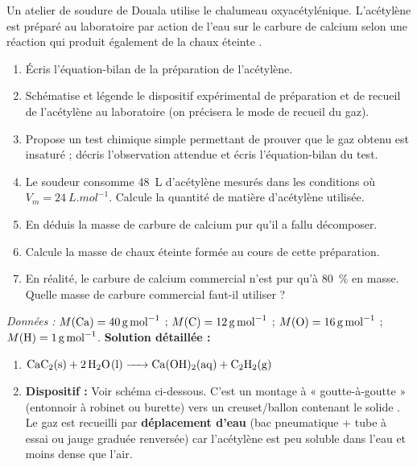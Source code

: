 \documentclass[11pt]{article}
\begin{document}
\begin{exoresolu}
Un atelier de soudure de Douala utilise le chalumeau oxyacétylénique. L'acétylène  est préparé au laboratoire par action de l'eau sur le carbure de calcium  selon une réaction qui produit également de la chaux éteinte .
\begin{enumerate}
\item Écris l'équation-bilan de la préparation de l'acétylène.
\item Schématise et légende le dispositif expérimental de préparation et de recueil de l'acétylène au laboratoire (on précisera le mode de recueil du gaz).
\item Propose un test chimique simple permettant de prouver que le gaz obtenu est insaturé ; décris l'observation attendue et écris l'équation-bilan du test.
\item Le soudeur consomme \SI{48}{L} d'acétylène mesurés dans les conditions où $V_m = \SI{24}{L.mol^{-1}}$. Calcule la quantité de matière d'acétylène utilisée.
\item En déduis la masse de carbure de calcium pur qu'il a fallu décomposer.
\item Calcule la masse de chaux éteinte  formée au cours de cette préparation.
\item En réalité, le carbure de calcium commercial n'est pur qu'à \SI{80}{\%} en masse. Quelle masse de carbure commercial faut-il utiliser ?
\end{enumerate}
\emph{Données :} $M(\ce{Ca}) = \SI{40}{g.mol^{-1}}$ ; $M(\ce{C}) = \SI{12}{g.mol^{-1}}$ ; $M(\ce{O}) = \SI{16}{g.mol^{-1}}$ ; $M(\ce{H}) = \SI{1}{g.mol^{-1}}$.
\tcblower
\textbf{Solution détaillée :}
\begin{enumerate}
\item $\ce{CaC2(s) + 2 H2O(l) -> Ca(OH)2(aq) + C2H2(g)}$
\item \textbf{Dispositif :} Voir schéma ci-dessous. C'est un montage à « goutte-à-goutte » (entonnoir à robinet ou burette) vers un creuset/ballon contenant le solide . Le gaz est recueilli par \textbf{déplacement d'eau} (bac pneumatique + tube à essai ou jauge graduée renversée) car l'acétylène est peu soluble dans l'eau et moins dense que l'air.
  \begin{popfigure}
\end{popfigure}
\end{enumerate}
\end{exoresolu}
\end{document}
